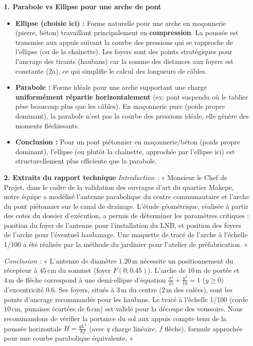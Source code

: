 \documentclass[11pt]{article}
\begin{document}
\begin{exoresolu}
\medskip
\noindent \textbf{1. Parabole vs Ellipse pour une arche de pont}
\begin{itemize}
    \item \textbf{Ellipse (choisie ici) :} Forme naturelle pour une arche en maçonnerie (pierre, béton) travaillant principalement en \textbf{compression}. La poussée est transmise aux appuis suivant la courbe des pressions qui se rapproche de l'ellipse (ou de la chaînette). Les foyers sont des points stratégiques pour l'ancrage des tirants (haubans) car la somme des distances aux foyers est constante ($2a$), ce qui simplifie le calcul des longueurs de câbles.
    \item \textbf{Parabole :} Forme idéale pour une arche supportant une charge \textbf{uniformément répartie horizontalement} (ex: pont suspendu où le tablier pèse beaucoup plus que les câbles). En maçonnerie pure (poids propre dominant), la parabole n'est pas la courbe des pressions idéale, elle génère des moments fléchissants.
    \item \textbf{Conclusion :} Pour un pont piétonnier en maçonnerie/béton (poids propre dominant), l'ellipse (ou plutôt la chaînette, approchée par l'ellipse ici) est structurellement plus efficiente que la parabole.
\end{itemize}

\medskip
\noindent \textbf{2. Extraits du rapport technique}
\emph{Introduction :} « Monsieur le Chef de Projet, dans le cadre de la validation des ouvrages d'art du quartier Makepe, notre équipe a modélisé l'antenne parabolique du centre communautaire et l'arche du pont piétonnier sur le canal de drainage. L'étude géométrique, réalisée à partir des cotes du dossier d'exécution, a permis de déterminer les paramètres critiques : position du foyer de l'antenne pour l'installation du LNB, et position des foyers de l'arche pour l'éventuel haubanage. Une maquette de tracé de l'arche à l'échelle 1/100 a été réalisée par la méthode du jardinier pour l'atelier de préfabrication. »

\emph{Conclusion :} « L'antenne de diamètre $\num{1,20}\,\text{m}$ nécessite un positionnement du récepteur à $\num{45}\,\text{cm}$ du sommet (foyer $F(0;\num{0,45})$). L'arche de $\num{10}\,\text{m}$ de portée et $\num{4}\,\text{m}$ de flèche correspond à une demi-ellipse d'équation $\frac{x^2}{25}+\frac{y^2}{16}=1$ ($y\ge0$) d'excentricité $\num{0,6}$. Ses foyers, situés à $\num{3}\,\text{m}$ du centre ($\num{2}\,\text{m}$ des culées), sont les points d'ancrage recommandés pour les haubans. Le tracé à l'échelle 1/100 (corde $\num{10}\,\text{cm}$, punaises écartées de $\num{6}\,\text{cm}$) est validé pour la découpe des voussoirs. Nous recommandons de vérifier la portance du sol aux appuis compte tenu de la poussée horizontale $H = \frac{q L^2}{8f}$ (avec $q$ charge linéaire, $f$ flèche), formule approchée pour une courbe parabolique équivalente. »
\end{exoresolu}
\end{document}
